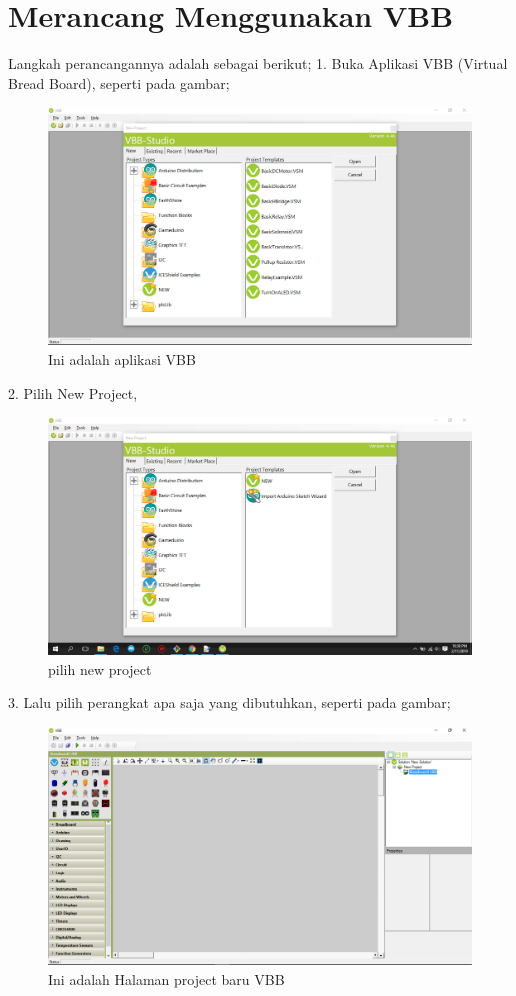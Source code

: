 \section{Merancang Menggunakan VBB}
Langkah perancangannya adalah sebagai berikut;
1. Buka Aplikasi VBB (Virtual Bread Board), seperti pada gambar;
\begin{figure}[ht]
  \centerline{\includegraphics[width=.75\textwidth]{figures/bukaaplikasi.png}}
  \caption{Ini adalah aplikasi VBB}
  \label{fig:bukaaplikasi}
  \end{figure}
2. Pilih New Project,
\begin{figure}[ht]
  \centerline{\includegraphics[width=.75\textwidth]{figures/newproject.png}}
  \caption{pilih new project}
  \label{fig:newproject}
  \end{figure}
3. Lalu pilih perangkat apa saja yang dibutuhkan, seperti pada gambar;
\begin{figure}[ht]
  \centerline{\includegraphics[width=.75\textwidth]{figures/halvbb.png}}
  \caption{Ini adalah Halaman project baru VBB}
  \label{fig:halvbb}
  \end{figure}

